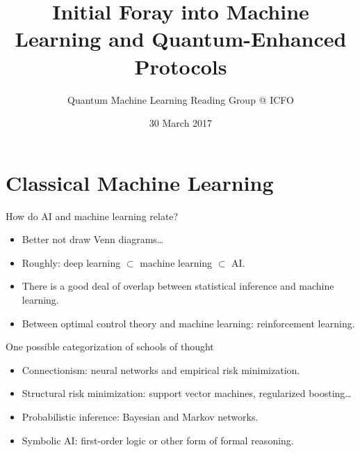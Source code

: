 \documentclass[compress]{beamer}\usetheme{Warsaw}\usecolortheme{crane}\useoutertheme[subsection=false]{smoothbars}
\title[Initial Foray into ML and Quantum-Enhanced Protocols]{Initial Foray into Machine Learning and Quantum-Enhanced Protocols}
\author{Quantum Machine Learning Reading Group @ ICFO}
\date{30 March 2017}
\begin{document}
\frame[plain]{
  \titlepage
}

\section{Classical Machine Learning}
\begin{frame}{How do AI and machine learning relate?}
\begin{itemize}
	\item Better not draw Venn diagrams\ldots
	\item Roughly: deep learning $\subset$ machine learning $\subset$ AI.
	\item There is a good deal of overlap between statistical inference and machine learning.
	\item Between optimal control theory and machine learning: reinforcement learning.
\end{itemize}
\end{frame}

\begin{frame}{One possible categorization of schools of thought}
\begin{itemize}
 \item Connectionism: neural networks and empirical risk minimization.
 \item Structural risk minimization: support vector machines, regularized boosting\ldots
 \item Probabilistic inference: Bayesian and Markov networks.
 \item Symbolic AI: first-order logic or other form of formal reasoning.
\end{itemize}
\end{frame}
\end{document}
